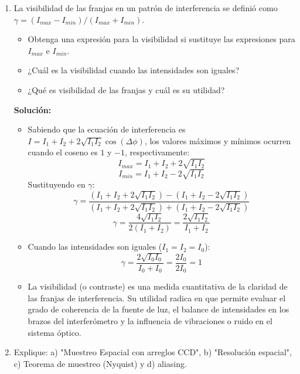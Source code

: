 \documentclass[12pt, letterpaper]{article}
\begin{document}
\begin{enumerate}
		\item La visibilidad de las franjas en un patrón de interferencia se definió como $\gamma=(I_{max}-I_{min})/(I_{max}+I_{min})$. 
		\begin{itemize}
			\item Obtenga una expresión para la visibilidad si sustituye las expresiones para $I_{max}$ e $I_{min}$.
			\item ¿Cuál es la visibilidad cuando las intensidades son iguales?
			\item ¿Qué es visibilidad de las franjas y cuál es su utilidad?  
		\end{itemize}
		
		\textbf{Solución:}
		\begin{itemize}
			\item Sabiendo que la ecuación de interferencia es $I = I_1 + I_2 + 2\sqrt{I_1 I_2}\cos(\Delta\phi)$, los valores máximos y mínimos ocurren cuando el coseno es $1$ y $-1$, respectivamente:
			$$ I_{max} = I_1 + I_2 + 2\sqrt{I_1 I_2} $$
			$$ I_{min} = I_1 + I_2 - 2\sqrt{I_1 I_2} $$
			Sustituyendo en $\gamma$:
			$$ \gamma = \frac{(I_1 + I_2 + 2\sqrt{I_1 I_2}) - (I_1 + I_2 - 2\sqrt{I_1 I_2})}{(I_1 + I_2 + 2\sqrt{I_1 I_2}) + (I_1 + I_2 - 2\sqrt{I_1 I_2})} $$
			$$ \gamma = \frac{4\sqrt{I_1 I_2}}{2(I_1 + I_2)} = \frac{2\sqrt{I_1 I_2}}{I_1 + I_2} $$
			
			\item Cuando las intensidades son iguales ($I_1 = I_2 = I_0$):
			$$ \gamma = \frac{2\sqrt{I_0 I_0}}{I_0 + I_0} = \frac{2I_0}{2I_0} = 1 $$
			
			\item La visibilidad (o contraste) es una medida cuantitativa de la claridad de las franjas de interferencia. Su utilidad radica en que permite evaluar el grado de coherencia de la fuente de luz, el balance de intensidades en los brazos del interferómetro y la influencia de vibraciones o ruido en el sistema óptico.
		\end{itemize}
		
		\item Explique: a) "Muestreo Espacial con arreglos CCD", b) "Resolución espacial", c) Teorema de muestreo (Nyquist) y d) aliasing. 
		

\end{enumerate}
\end{document}
